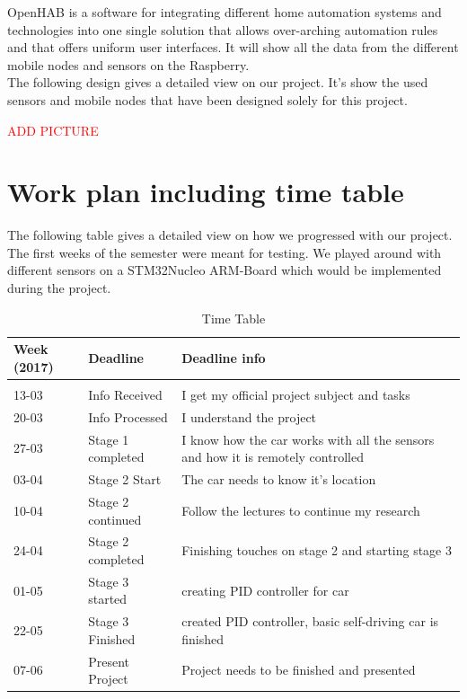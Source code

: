 \documentclass[a4paper,notitlepage]{article}
\begin{document}
OpenHAB is a software for integrating different home automation systems and technologies into one single solution that allows over-arching automation rules and that offers uniform user interfaces. It will show all the data from the different mobile nodes and sensors on the Raspberry.\\

The following design gives a detailed view on our project. It's show the used sensors and mobile nodes that have been designed solely for this project.

\textcolor{red}{ADD PICTURE}

\section*{Work plan including time table}

The following table gives a detailed view on how we progressed with our project. The first weeks of the semester were meant for testing. We played around with different sensors on a STM32Nucleo ARM-Board which would be implemented during the project.

\begin{table}[h]
\centering
\begin{tabular}{ l | p{3cm} | p{6cm} }
	
	{\bf{Week (2017)}} & {\bf{Deadline}} & {\bf{Deadline info}} \\
	\hline
	&&\\
	13-03 & Info Received & I get my official project subject and tasks \\
	20-03 & Info Processed & I understand the project \\
	27-03 & Stage 1 completed & I know how the car works with all the sensors and how it is remotely controlled \\
	03-04 & Stage 2 Start & The car needs to know it's location\\
	10-04 & Stage 2 continued & Follow the lectures to continue my research\\
	24-04 & Stage 2 completed & Finishing touches on stage 2 and starting stage 3\\
	01-05 & Stage 3 started & creating PID controller for car\\
	22-05 & Stage 3 Finished & created PID controller, basic self-driving car is finished\\ 
	07-06 & Present Project & Project needs to be finished and presented\\
\end{tabular}
\caption{Time Table}
\end{table}
\end{document}
